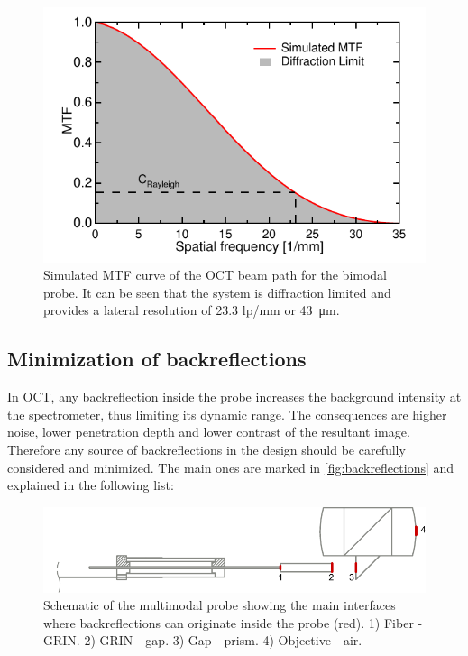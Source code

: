 \begin{figure}[h!]\centering
      \includegraphics{figures/30_DesignSimulation/Optical/MTF/MTF_Sim.pdf}
      \caption{Simulated MTF curve of the OCT beam path for the bimodal probe. It can be seen that the system is diffraction limited and provides a lateral resolution of 23.3 lp/mm or \SI{43}{\micro\meter}.}
      \label{fig:MTFsim}
\end{figure}

\subsection{Minimization of backreflections}
In OCT, any backreflection inside the probe increases the background intensity at the spectrometer, thus limiting its dynamic range. The consequences are higher noise, lower penetration depth and lower contrast of the resultant image. Therefore any source of backreflections in the design should be carefully considered and minimized. The main ones are marked in \autoref{fig:backreflections} and explained in the following list:

\begin{figure}[h!]\centering
      \includegraphics{figures/30_DesignSimulation/Optical/Backreflections/backreflections.pdf}
      \caption{Schematic of the multimodal probe showing the main interfaces where backreflections can originate inside the probe (red). 1) Fiber - GRIN. 2) GRIN - gap. 3) Gap - prism. 4) Objective - air. }
      \label{fig:backreflections}
\end{figure}


